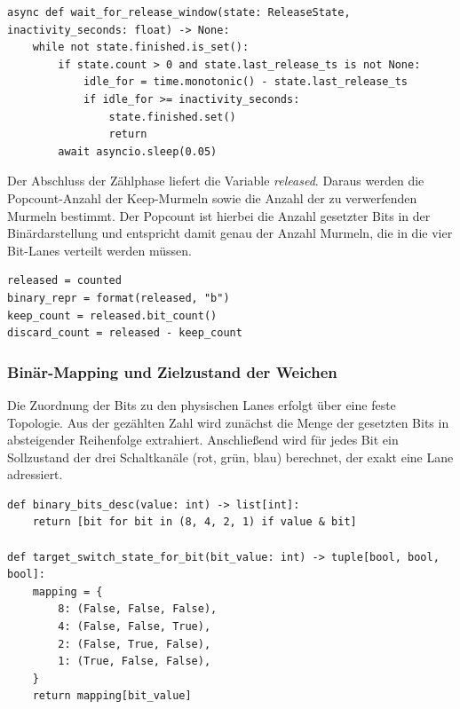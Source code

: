 \begin{listing}[ht]
\caption{Auszug: Inaktivitätsbasierte Beendigung der Zählung}
\label{lst:release_window}
\begin{verbatim}
async def wait_for_release_window(state: ReleaseState, inactivity_seconds: float) -> None:
	while not state.finished.is_set():
		if state.count > 0 and state.last_release_ts is not None:
			idle_for = time.monotonic() - state.last_release_ts
			if idle_for >= inactivity_seconds:
				state.finished.set()
				return
		await asyncio.sleep(0.05)
\end{verbatim}
\end{listing}

Der Abschluss der Zählphase liefert die Variable \emph{released}. Daraus werden die Popcount-Anzahl der Keep-Murmeln sowie die Anzahl der zu verwerfenden Murmeln bestimmt. Der Popcount ist hierbei die Anzahl gesetzter Bits in der Binärdarstellung und entspricht damit genau der Anzahl Murmeln, die in die vier Bit-Lanes verteilt werden müssen.

\begin{listing}[ht]
\caption{Auszug: Ableitung von Keep/Discard aus der gezählten Murmelanzahl}
\label{lst:keep_discard}
\begin{verbatim}
released = counted
binary_repr = format(released, "b")
keep_count = released.bit_count()
discard_count = released - keep_count
\end{verbatim}
\end{listing}

\subsubsection{Binär-Mapping und Zielzustand der Weichen}
Die Zuordnung der Bits zu den physischen Lanes erfolgt über eine feste Topologie. Aus der gezählten Zahl wird zunächst die Menge der gesetzten Bits in absteigender Reihenfolge extrahiert. Anschließend wird für jedes Bit ein Sollzustand der drei Schaltkanäle (rot, grün, blau) berechnet, der exakt eine Lane adressiert.

\begin{listing}[ht]
\caption{Auszug: Bit-Extraktion und Zuordnung auf Schaltzustände (rot, grün, blau)}
\label{lst:bit_mapping}
\begin{verbatim}
def binary_bits_desc(value: int) -> list[int]:
	return [bit for bit in (8, 4, 2, 1) if value & bit]

def target_switch_state_for_bit(bit_value: int) -> tuple[bool, bool, bool]:
	mapping = {
		8: (False, False, False),
		4: (False, False, True),
		2: (False, True, False),
		1: (True, False, False),
	}
	return mapping[bit_value]
\end{verbatim}
\end{listing}


